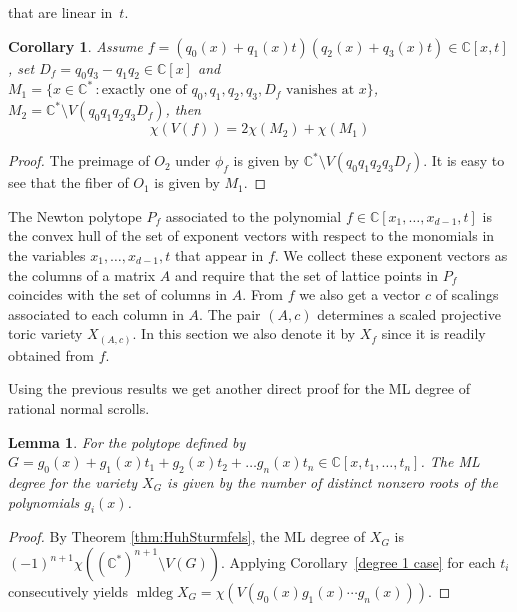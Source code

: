 \documentclass[12pt,reqno]{amsart}   	%
\theoremstyle{plain}
\newtheorem{lemma}[theorem]{Lemma}
\newtheorem{corollary}[theorem]{Corollary}
\theoremstyle{definition}
\theoremstyle{remark}
\newcommand{\C}{\mathbb{C}}
\newcommand{\mldeg}{\operatorname{mldeg}}
\begin{document}
that are linear in~$t$.
\begin{corollary} \label{cor:deg2case}
    Assume $f= (q_0(x)+q_1(x)t)(q_2(x)+q_3(x)t)\in \C[x,t]$, set $D_f=q_0q_3-q_1q_2 \in \C[x]$ and $M_1 = \{x\in \C^\ast \,: \text{exactly one of } q_0,q_1,q_2,q_3,D_f \text{ vanishes at } x \}$, $M_2=\C^\ast \setminus V(q_0q_1q_2q_3D_f)$, then
    \[
    \chi(V(f)) = 2\chi(M_2)+\chi(M_1)
    \]
\end{corollary}
\begin{proof}
    The preimage  of $O_2$ under $\phi_f$ is given by $\C^\ast \setminus V(q_0q_1q_2q_3D_f)$. It is easy to see that the fiber of $O_1$ is given by $M_1$.
\end{proof}
The Newton polytope $P_f$ associated to the polynomial $f\in\C[x_1,\ldots,x_{d-1},t]$ is the convex hull of the
set of exponent vectors with respect to the monomials
in the variables $x_1,\ldots,x_{d-1},t$ that appear in $f$.
We collect these exponent vectors as the columns of a matrix $A$ and
require that the set of lattice points in $P_f$ coincides
with the set of columns in $A$. From $f$ we also get a vector
$c$ of scalings associated to each column in $A$. The pair
$(A,c)$ determines a scaled projective toric variety $X_{(A,c)}$.
In this section we also denote it by $X_{f}$ since it is readily
obtained from $f$.

Using the previous results we get another direct proof for the ML degree of rational normal scrolls.
\begin{lemma}\cite{amendola2019}
    For the polytope defined by $G = g_0(x)+g_1(x)t_1+g_2(x)t_2+\dots g_n(x)t_n \in \C[x,t_1,\dots,t_n]$. The ML degree for the variety $X_{G}$ is given by the number of distinct nonzero roots of the polynomials $g_i(x)$.
\end{lemma}
\begin{proof}
     By Theorem \ref{thm:HuhSturmfels}, the ML degree of $X_{G}$ is $(-1)^{n+1}\chi((\C^\ast)^{n+1}\setminus V(G))$. Applying Corollary~\ref{degree 1 case} for each $t_i$ consecutively yields $\mldeg X_{G} = \chi(V(g_0(x)g_1(x)\cdots g_n(x)))$. 
\end{proof}
\end{document}
